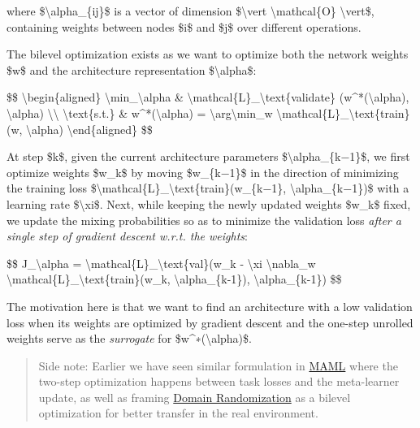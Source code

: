 where \$\textbackslash alpha\_\{ij\}\$ is a vector of dimension \$\textbackslash vert \textbackslash mathcal\{O\} \textbackslash vert\$, containing weights between nodes \$i\$ and \$j\$ over different operations.

The bilevel optimization exists as we want to optimize both the network weights \$w\$ and the architecture representation \$\textbackslash alpha\$:

\$\$ \textbackslash begin\{aligned\} \textbackslash min\_\textbackslash alpha \& \textbackslash mathcal\{L\}\_\textbackslash text\{validate\} (w\^{}*(\textbackslash alpha), \textbackslash alpha) \textbackslash\textbackslash{} \textbackslash text\{s.t.\} \& w\^{}*(\textbackslash alpha) = \textbackslash arg\textbackslash min\_w \textbackslash mathcal\{L\}\_\textbackslash text\{train\} (w, \textbackslash alpha) \textbackslash end\{aligned\} \$\$

At step \$k\$, given the current architecture parameters \$\textbackslash alpha\_\{k−1\}\$, we first optimize weights \$w\_k\$ by moving \$w\_\{k−1\}\$ in the direction of minimizing the training loss \$\textbackslash mathcal\{L\}\_\textbackslash text\{train\}(w\_\{k−1\}, \textbackslash alpha\_\{k−1\})\$ with a learning rate \$\textbackslash xi\$. Next, while keeping the newly updated weights \$w\_k\$ fixed, we update the mixing probabilities so as to minimize the validation loss \emph{after a single step of gradient descent w.r.t. the weights}:

\$\$ J\_\textbackslash alpha = \textbackslash mathcal\{L\}\_\textbackslash text\{val\}(w\_k - \textbackslash xi \textbackslash nabla\_w \textbackslash mathcal\{L\}\_\textbackslash text\{train\}(w\_k, \textbackslash alpha\_\{k-1\}), \textbackslash alpha\_\{k-1\}) \$\$

The motivation here is that we want to find an architecture with a low validation loss when its weights are optimized by gradient descent and the one-step unrolled weights serve as the \emph{surrogate} for \$w\^{}∗(\textbackslash alpha)\$.

\begin{quote}
Side note: Earlier we have seen similar formulation in \href{https://lilianweng.github.io/posts/2018-11-30-meta-learning/\#maml}{MAML} where the two-step optimization happens between task losses and the meta-learner update, as well as framing \href{https://lilianweng.github.io/posts/2019-05-05-domain-randomization/\#dr-as-optimization}{Domain Randomization} as a bilevel optimization for better transfer in the real environment.
\end{quote}

